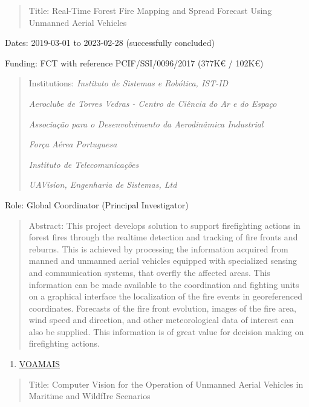 \documentclass[
]{article}
\begin{document}
\begin{quote}
Title: Real­-Time Forest Fire Mapping and Spread Forecast Using Unmanned
Aerial Vehicles
\end{quote}

Dates: 2019-03-01 to 2023-02-28 (successfully concluded)

Funding: FCT with reference PCIF/SSI/0096/2017 (377K€ / 102K€)

\begin{quote}
Institutions: \emph{Instituto de Sistemas e Robótica, IST-ID}

\emph{Aeroclube de Torres Vedras - Centro de Ciência do Ar e do Espaço}

\emph{Associação para o Desenvolvimento da Aerodinâmica Industrial}

\emph{Força Aérea Portuguesa}

\emph{Instituto de Telecomunicações}

\emph{UAVision, Engenharia de Sistemas, Ltd}
\end{quote}

Role: Global Coordinator (Principal Investigator)

\begin{quote}
Abstract: This project develops solution to support firefighting actions
in forest fires through the real­time detection and tracking of fire
fronts and re­burns. This is achieved by processing the information
acquired from manned and unmanned aerial vehicles equipped with
specialized sensing and communication systems, that overfly the affected
areas. This information can be made available to the coordination and
fighting units on a graphical interface the localization of the fire
events in georeferenced coordinates. Forecasts of the fire front
evolution, images of the fire area, wind speed and direction, and other
meteorological data of interest can also be supplied. This information
is of great value for decision making on firefighting actions.
\end{quote}

\begin{enumerate}
\def\labelenumi{\arabic{enumi}.}
\setcounter{enumi}{2}
\item
  \ul{VOAMAIS}
\end{enumerate}

\begin{quote}
Title: Computer Vision for the Operation of Unmanned Aerial Vehicles in
Maritime and WildfIre Scenarios
\end{quote}
\end{document}
